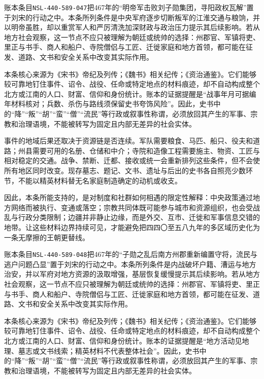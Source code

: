 账本条目\texttt{NSL-440-589-047}把467年的“明帝军击败刘子勋集团，寻阳政权瓦解”置于刘宋的行动之中。本条所列条件是中央军府逐步切断叛军的江淮交通与粮饷，并以明帝虽胜，却以重赏军人和严厉清洗加深财政与政治压力提示其后续影响。若从地方社会观察，这一节点不应只被理解为朝廷或统帅的选择：州郡官、军镇将吏、里正与书手、商人和船户、寺院僧侣与工匠、迁徙家庭和地方首领，都可能在征发、道路、文书和安全关系中改变其实际作用。

本条核心来源为《宋书》帝纪及列传；《魏书》相关纪传；《资治通鉴》。它们能够较可靠地钉住事件、诏令、战役、任命或特定地点的材料痕迹，却不自动构成整个北方或江南的人口、财富、信仰和身份统计。账本的证据提醒是“战事年月可据编年材料核对；兵数、杀伤与路线须保留史书夸饰风险”。因此，史书中的“降”“叛”“胡”“蛮”“僧”“流民”等行政或叙事性称谓，必须放回其产生的军事、宗教和治理语境，不能被转写为固定且内部无差异的社会实体。

事件的地域后果还取决于资源链是否连续。军队需要粮食、马匹、船只、役夫和道路；州县需要可用的名册、仓储和中介；寺院和造像工程需要施主、物资、工匠与相对稳定的交通。战争、禁断、迁都、接收或统一会重新排列这些条件，但不会使所有地区同时改变。现存墓志、题记、文书、遗址与后出的史书各自照亮少数环节，不能以精英材料替无名家庭制造确定的动机或收支。

因此，本条所能支持的，是对制度和社群如何相遇的限定性解释：中央政策通过地方网络而被执行、变通或落空；宗教共同体既可能参与城市和资源组织，也会受战乱与行政分类限制；边疆并非静止边缘，而是外交、互市、迁徙和军事信息交错的地带。让这些材料边界持续可见，才能避免把四四〇至五八九年的多区域历史化为一条无摩擦的王朝更替线。

账本条目\texttt{NSL-440-589-048}把467年的“子勋之乱后南方州郡重新编置守将，流民与逃户问题凸显”置于刘宋的行动之中。本条所列条件是内战破坏户籍、漕运与地方治安，并以军府对地方资源的汲取增强，基层恢复缓慢提示其后续影响。若从地方社会观察，这一节点不应只被理解为朝廷或统帅的选择：州郡官、军镇将吏、里正与书手、商人和船户、寺院僧侣与工匠、迁徙家庭和地方首领，都可能在征发、道路、文书和安全关系中改变其实际作用。

本条核心来源为《宋书》帝纪及列传；《魏书》相关纪传；《资治通鉴》。它们能够较可靠地钉住事件、诏令、战役、任命或特定地点的材料痕迹，却不自动构成整个北方或江南的人口、财富、信仰和身份统计。账本的证据提醒是“地方活动见地理、墓志或文书线索；精英材料不代表整体社会”。因此，史书中的“降”“叛”“胡”“蛮”“僧”“流民”等行政或叙事性称谓，必须放回其产生的军事、宗教和治理语境，不能被转写为固定且内部无差异的社会实体。

